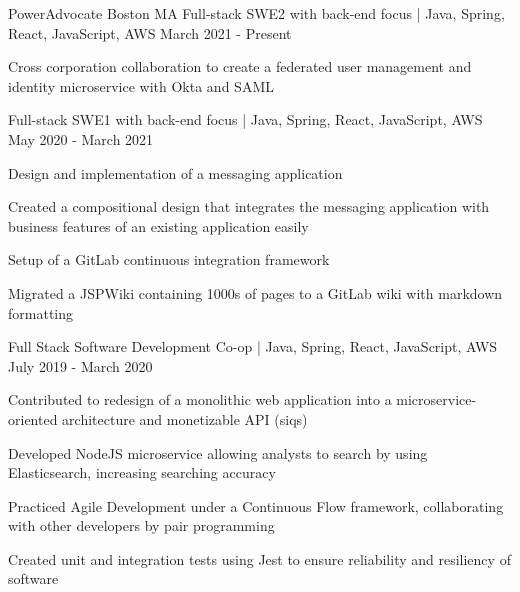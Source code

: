 
\begin{cventries}
\cventrythreepositions
    {PowerAdvocate}
    {Boston MA}
    {Full-stack SWE2 with back-end focus | Java, Spring, React, JavaScript, AWS} %
    {March 2021 - Present} %
    {
        \begin{cvitems} %
            \item {Cross corporation collaboration to create a federated user management and identity microservice with Okta and SAML}
        \end{cvitems}
    }
    {Full-stack SWE1 with back-end focus | Java, Spring, React, JavaScript, AWS}
    {May 2020 - March 2021}
    {
      \begin{cvitems} %
        \item {Design and implementation of a messaging application}
        \item {Created a compositional design that integrates the messaging application with business features of an existing application easily}
        \item {Setup of a GitLab continuous integration framework}
        \item {Migrated a JSPWiki containing 1000s of pages to a GitLab wiki with markdown formatting}
      \end{cvitems}
    }
    {Full Stack Software Development Co-op | Java, Spring, React, JavaScript, AWS}
    {July 2019 - March 2020}
    {
      \begin{cvitems} %
        \item {Contributed to redesign of a monolithic web application into a microservice-oriented architecture and monetizable API (siqs)}
        \item {Developed NodeJS microservice allowing analysts to search by using Elasticsearch, increasing searching accuracy}
        \item {Practiced Agile Development under a Continuous Flow framework, collaborating with other developers by pair programming}
        \item {Created unit and integration tests using Jest to ensure reliability and resiliency of software}
      \end{cvitems}
    }


\end{cventries}
